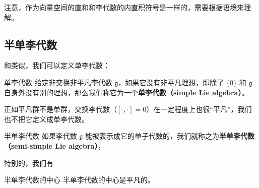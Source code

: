 注意，作为向量空间的直和和李代数的内直积符号是一样的，需要根据语境来理解。

\subsection{半单李代数}

和类似，我们可以定义单李代数：

\begin{definition}{单李代数}
给定非交换非平凡李代数 $\mathfrak{g}$，如果它没有非平凡理想，即除了 $\{0\}$ 和 $\mathfrak{g}$ 自身外没有别的理想，那么我们称它为一个\textbf{单李代数（simple Lie algebra）}。
\end{definition}

正如平凡群不是单群，交换李代数（$[\cdot, \cdot] = 0$）在一定程度上也很“平凡”，我们也不把它定义成单李代数。


\begin{definition}{半单李代数}\label{def_LieSub_1}
如果李代数 $\mathfrak{g}$ 能被表示成它的单子代数的，我们就称之为\textbf{半单李代数（semi-simple Lie algebra）}，
\end{definition}

特别的，我们有
\begin{theorem}{半单李代数的中心}
半单李代数的中心是平凡的。
\end{theorem}


